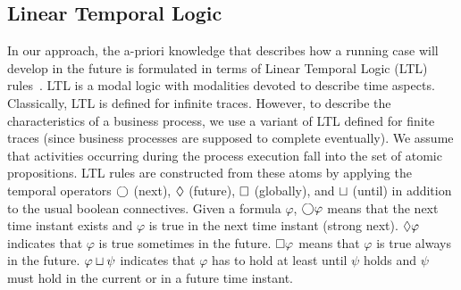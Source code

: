 

		
		




\subsection{Linear Temporal Logic}
In our approach, the a-priori knowledge that describes how a running case will develop in the future is formulated in terms of Linear Temporal Logic (LTL) rules~\cite{Pnueli77}. LTL is a modal logic with modalities devoted to describe time aspects. Classically, LTL is defined for infinite traces. However, to describe the characteristics of a business process, we use a variant of LTL defined for finite traces (since business processes are supposed to complete eventually).
%
We assume that activities occurring during the process execution fall into the set of atomic propositions. LTL rules are constructed from these atoms by applying the temporal operators $\bigcirc$ (next), $\lozenge$ (future), $\square$ (globally), and $\sqcup$ (until) in addition to the usual boolean connectives. Given a formula $\varphi$, $\bigcirc \varphi$ means that the next time instant exists and $\varphi$ is true in the next time instant (strong next). $\lozenge \varphi$ indicates that $\varphi$ is true sometimes in the future. $\square \varphi$ means that $\varphi$ is true always in the future. $\varphi \sqcup \psi$ indicates that $\varphi$ has to hold at least until $\psi$  holds and $\psi$ must hold in the current or in a future time instant.

